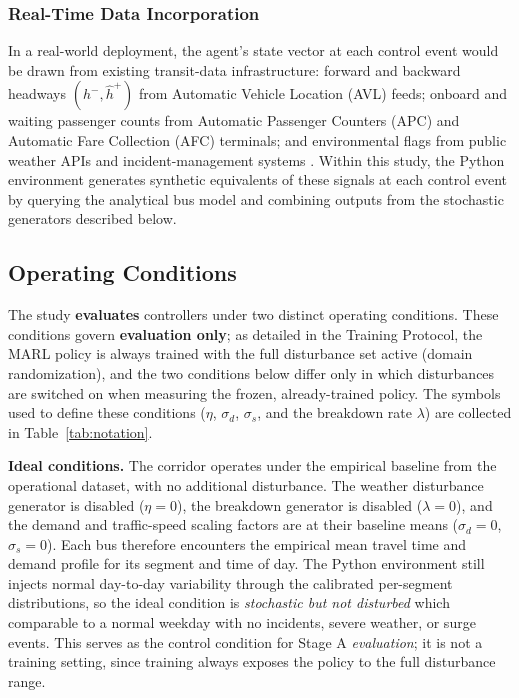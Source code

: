 \subsubsection{Real-Time Data Incorporation}

In a real-world deployment, the agent's state vector at each control event would be drawn from existing transit-data infrastructure: forward and backward headways $(h^-, \hat{h}^+)$ from Automatic Vehicle Location (AVL) feeds; onboard and waiting passenger counts from Automatic Passenger Counters (APC) and Automatic Fare Collection (AFC) terminals; and environmental flags from public weather APIs and incident-management systems \cite{Wangsun}. Within this study, the Python environment generates synthetic equivalents of these signals at each control event by querying the analytical bus model and combining outputs from the stochastic generators described below.

\subsection{Operating Conditions}

The study \textbf{evaluates} controllers under two distinct operating conditions. These conditions govern \textbf{evaluation only}; as detailed in the Training Protocol, the MARL policy is always trained with the full disturbance set active (domain randomization), and the two conditions below differ only in which disturbances are switched on when measuring the frozen, already-trained policy. The symbols used to define these conditions ($\eta$, $\sigma_d$, $\sigma_s$, and the breakdown rate $\lambda$) are collected in Table~\ref{tab:notation}.

\textbf{Ideal conditions.} The corridor operates under the empirical baseline from the operational dataset, with no additional disturbance. The weather disturbance generator is disabled ($\eta = 0$), the breakdown generator is disabled ($\lambda = 0$), and the demand and traffic-speed scaling factors are at their baseline means ($\sigma_d = 0$, $\sigma_s = 0$). Each bus therefore encounters the empirical mean travel time and demand profile for its segment and time of day. The Python environment still injects normal day-to-day variability through the calibrated per-segment distributions, so the ideal condition is \textit{stochastic but not disturbed} which comparable to a normal weekday with no incidents, severe weather, or surge events. This serves as the control condition for Stage A \textit{evaluation}; it is not a training setting, since training always exposes the policy to the full disturbance range.

